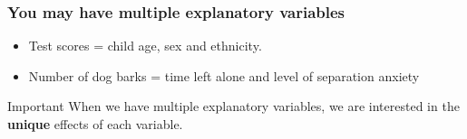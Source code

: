 \documentclass{beamer}
\begin{document}
\begin{frame}
\frametitle{You may have multiple explanatory variables}
\begin{itemize}
  \item Test scores = child age, sex and ethnicity.
  \item Number of dog barks = time left alone and level of separation anxiety
\end{itemize}
\vspace{1cm}
\begin{alertblock}{Important}
When we have multiple explanatory variables, we are interested in the \textbf{unique} effects of each variable.
\end{alertblock}
\end{frame}
\end{document}
